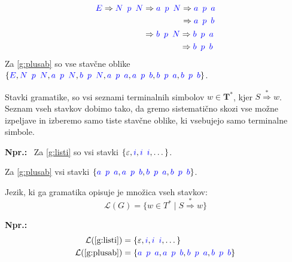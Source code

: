 \documentclass{article}
\newcommand{\Ex}{\textbf{Npr.:}\ }
\newcommand{\Set}[1]{\mathbf{#1}}
\newcommand{\Symbol}[1]{\textcolor{blue}{#1}}
\newcommand{\Grammar}{G}
\newcommand{\Terminals}{\Set{T}}
\newcommand{\StartSymbol}{S}
\newcommand{\Null}{\varepsilon}
\newcommand{\Language}[1]{\mathcal{L}(#1)}
\newcommand{\MathRef}[1]{\text{\ref{#1}}}
\newcommand{\Derive}{\Rightarrow}
\newcommand{\DeriveStar}{\overset{\ast}{\Rightarrow}}
\newcommand{\Seq}{{\ \,}}
\newcommand{\Kleene}[1]{#1^\ast}
\begin{document}
  \begin{equation*}
    \Symbol{E} \Derive \Symbol{N} \Seq \Symbol{p} \Seq \Symbol{N} \begin{aligned}[t]
      &\Derive \Symbol{a} \Seq \Symbol{p} \Seq \Symbol{N} \begin{aligned}[t]
        &\Derive \Symbol{a} \Seq \Symbol{p} \Seq \Symbol{a}\\
        &\Derive \Symbol{a} \Seq \Symbol{p} \Seq \Symbol{b}\\
      \end{aligned}\\
      &\Derive \Symbol{b} \Seq \Symbol{p} \Seq \Symbol{N} \begin{aligned}[t]
        &\Derive \Symbol{b} \Seq \Symbol{p} \Seq \Symbol{a}\\
        &\Derive \Symbol{b} \Seq \Symbol{p} \Seq \Symbol{b}\\
      \end{aligned}
    \end{aligned}
  \end{equation*}
Za \ref{g:plusab} so vse stavčne oblike $\{\Symbol{E}, \Symbol{N} \Seq \Symbol{p} \Seq \Symbol{N}, \Symbol{a} \Seq \Symbol{p} \Seq \Symbol{N}, \Symbol{b} \Seq \Symbol{p} \Seq \Symbol{N}, \Symbol{a} \Seq \Symbol{p} \Seq \Symbol{a}, \Symbol{a} \Seq \Symbol{p} \Seq \Symbol{b}, \Symbol{b} \Seq \Symbol{p} \Seq \Symbol{a}, \Symbol{b} \Seq \Symbol{p} \Seq \Symbol{b} \}$.

Stavki gramatike, so vsi seznami terminalnih simbolov $w \in \Kleene{\Terminals}$, kjer $\StartSymbol \DeriveStar w$.
Seznam vseh stavkov dobimo tako, da gremo sistematično skozi vse možne izpeljave in izberemo samo tiste stavčne oblike, ki vsebujejo samo terminalne simbole.

\Ex
Za \ref{g:listi} so vsi stavki $\{\Null, \Symbol{i}, \Symbol{i} \Seq \Symbol{i}, \dots\}$.

Za \ref{g:plusab} vsi stavki $\{\Symbol{a} \Seq \Symbol{p} \Seq \Symbol{a}, \Symbol{a} \Seq \Symbol{p} \Seq \Symbol{b}, \Symbol{b} \Seq \Symbol{p} \Seq \Symbol{a}, \Symbol{b} \Seq \Symbol{p} \Seq \Symbol{b} \}$.

Jezik, ki ga gramatika opisuje je množica vseh stavkov:
\begin{equation*}
  \Language{\Grammar} = \{ w \in \Kleene{T} \mid \StartSymbol \DeriveStar w\}
\end{equation*}

\Ex
  \begin{align*}
    \Language{\MathRef{g:listi}} &= \{\Null, \Symbol{i}, \Symbol{i} \Seq \Symbol{i}, \dots\}\\
    \Language{\MathRef{g:plusab}} &= \{\Symbol{a} \Seq \Symbol{p} \Seq \Symbol{a}, \Symbol{a} \Seq \Symbol{p} \Seq \Symbol{b}, \Symbol{b} \Seq \Symbol{p} \Seq \Symbol{a}, \Symbol{b} \Seq \Symbol{p} \Seq \Symbol{b} \}
  \end{align*}
\end{document}
